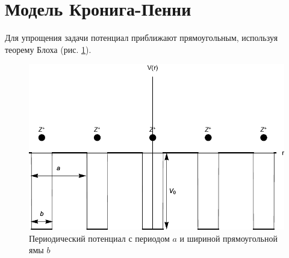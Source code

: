 \documentclass[a4paper, 12pt]{article}
\begin{document}
    \section{Модель Кронига-Пенни}
    Для упрощения задачи потенциал приближают прямоугольным, используя теорему Блоха (рис. \ref{fig:two}).
    \begin{figure}[h]
        \centering
        \includegraphics{fig2.pdf}
        \caption{Периодический потенциал с периодом $a$ и шириной прямоугольной ямы $b$}
        \label{fig:two}
    \end{figure}
\end{document}
